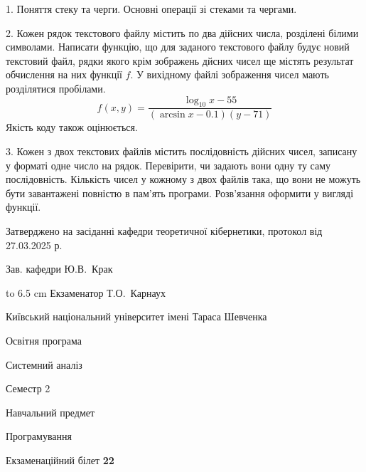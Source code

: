 \documentclass[12pt, ukrainian]{article}
\begin{document}
{%
1. Поняття стеку та черги. Основні операції зі стеками та чергами.%
\par
\vspace{2mm}

2. Кожен рядок текстового файлу містить по два дійсних числа, розділені білими символами.
Написати функцію, що для заданого текстового файлу будує новий текстовий файл, рядки якого крім зображень дйсних чисел ще містять результат обчислення на них функції $f$. У вихідному файлі зображення чисел мають розділятися пробілами. 
$$f(x, y) =\frac{\log_{10} x - 55}{(\arcsin x - 0.1) (y - 71)}$$ 
Якість коду також оцінюється.

\par
\vspace{2mm}

3. Кожен з двох текстових файлів містить послідовність дійсних чисел, записану у форматі одне число на рядок.  Перевірити, чи задають вони одну ту саму послідовність. Кількість чисел у кожному з двох файлів така, що вони не можуть бути завантажені повністю в пам'ять програми. Розв'язання оформити у вигляді функції.

}
{\smallskip\smallskip \begin {scriptsize} Затверджено на засіданні кафедри теоретичної кібернетики, протокол   від   27.03.2025 р.\par\smallskip\smallskip\smallskip\smallskip
{\parbox {6.5 cm} {Зав. кафедри \dotfill Ю.В.~Крак}}\hspace {0.7cm} {\hbox to 6.5 cm { Екзаменатор \dotfill Т.О.~Карнаух}} \end{scriptsize}}
\vspace{2.9cm}
{{\begin {scriptsize}\par
{ \center  Київський національний університет імені Тараса Шевченка \par}
{\parbox {5 cm}{Освітня програма \hfill}{\parbox {7 cm}{Системний аналіз\hfill}}\parbox {6 cm}{\hfill Семестр 2}}\par
{\parbox {5 cm} {Навчальний предмет \hfill}\parbox {7 cm}{Програмування \hfill}\parbox {6cm}{\hfill}\par}\vspace{-15pt} \end{scriptsize}}{\center Екзаменаційний білет \No \textbf { 22 }\par}}
\end{document}
